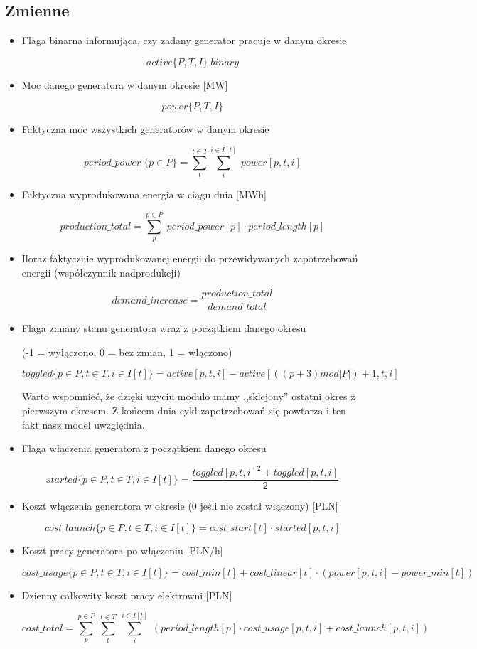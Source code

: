 \documentclass[12pt, twoside, hidelinks, a4paper]{article}
\begin{document}
\subsection{Zmienne}
\begin{itemize}

\item Flaga binarna informująca, czy zadany generator pracuje w danym okresie

$$active\{P,T,I\} \; binary$$
\item Moc danego generatora w danym okresie [MW]

$$power\{P,T,I\}$$
\item Faktyczna moc wszystkich generatorów w danym okresie

$$period\_power \; \{p \in P\} = \sum_{t}^{t \in T} \sum_{i}^{i \in I[t]} \; power[p,t,i]$$
\item Faktyczna wyprodukowana energia w ciągu dnia [MWh]

$$production\_total = \sum_{p}^{p \in P} \; period\_power[p] \cdot period\_length[p]$$
\item Iloraz faktycznie wyprodukowanej energii do przewidywanych zapotrzebowań energii (współczynnik nadprodukcji)

$$demand\_increase = \frac{production\_total}{demand\_total}$$
\item Flaga zmiany stanu generatora wraz z początkiem danego okresu

(-1 = wyłączono, 0 = bez zmian, 1 = włączono)

$$toggled \{p \in P, t \in T, i \in I[t] \} = active[p,t,i] - active[((p+3) mod |P|)+1,t,i]$$

Warto wspomnieć, że dzięki użyciu modulo mamy ,,sklejony'' ostatni okres z pierwszym okresem. Z końcem dnia cykl zapotrzebowań się powtarza i ten fakt nasz model uwzględnia.
\item Flaga włączenia generatora z początkiem danego okresu

$$started \{p \in P, t \in T, i \in I[t] \} = \frac{toggled[p,t,i]^2 + toggled[p,t,i]}{2}$$
\item Koszt włączenia generatora w okresie (0 jeśli nie został włączony) [PLN]

$$cost\_launch \{p \in P, t \in T, i \in I[t] \} = cost\_start[t] \cdot started[p,t,i]$$
\item Koszt pracy generatora po włączeniu [PLN/h]

$$cost\_usage \{p \in P, t \in T, i \in I[t] \} = cost\_min[t] + cost\_linear[t] \cdot (power[p,t,i] - power\_min[t])$$
\item Dzienny całkowity koszt pracy elektrowni [PLN]

$$cost\_total = \sum_{p}^{p \in P} \; \sum_{t}^{t \in T} \; \sum_{i}^{i \in I[t]} \; (period\_length[p] \cdot cost\_usage[p,t,i] + cost\_launch[p,t,i])$$
\end{itemize}
\end{document}
